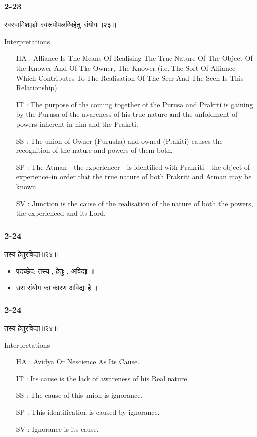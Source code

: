 \begin{frame}[fragile]\frametitle{2-23}
\begin{sanskrit}
स्वस्वामिशक्त्योः स्वरूपोपलब्धिहेतुः संयोगः॥२३॥
\end{sanskrit}

Interpretations
\begin{itemize}
\item [HA]: Alliance Is The Means Of Realising The True Nature Of The Object Of the Knower And Of The Owner, The Knower (i.e. The Sort Of Alliance Which Contributes To The Realisation Of The Seer And The Seen Is This Relationship)
\item [IT]: The purpose of the coming together of the Purusa and Prakrti is gaining by the Purusa of the awareness of his true nature and the unfoldment of powers inherent in him and the Prakrti.
\item [SS]: The union of Owner (Purusha) and owned (Prakiti) causes the recognition of the nature and powers of them both.
\item [SP]: The Atman—the experiencer—is identified with Prakriti—the object of experience–in order that the true nature of both Prakriti and Atman may be known.
\item [SV]: Junction is the cause of the realisation of the nature of both the powers, the experienced and its Lord. 
\end{itemize}
	
\end{frame}

\begin{frame}[fragile]\frametitle{2-24}
\begin{sanskrit}
तस्य हेतुरविद्या॥२४॥
\end{sanskrit}

\begin{itemize}
\item पदच्छेद: तस्य , हेतुः , अविद्या ॥
\item उस संयोग का कारण अविद्या है ।
\end{itemize}
	
\end{frame}


\begin{frame}[fragile]\frametitle{2-24}
\begin{sanskrit}
तस्य हेतुरविद्या॥२४॥
\end{sanskrit}

Interpretations
\begin{itemize}
\item [HA]: Avidya Or Nescience As Its Cause.
\item [IT]: Its cause is the lack of awareness of his Real nature.
\item [SS]: The cause of this union is ignorance.
\item [SP]: This identification is caused by ignorance.
\item [SV]: Ignorance is its cause. 
\end{itemize}
	
\end{frame}

